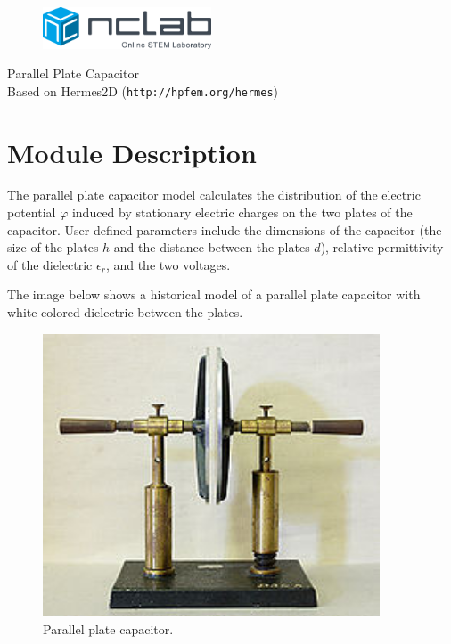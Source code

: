 \documentclass{article}
\begin{document}
\large

\vbox{}
\vspace{-2cm}
\begin{figure}[!ht]
\includegraphics[width=5cm]{img/logo.png}
\vspace{4mm}
\end{figure}
\noindent
\begin{center}
{\Huge Parallel Plate Capacitor}\\[2mm]
Based on Hermes2D ({\tt http://hpfem.org/hermes})\\[6mm]
\end{center}
\section{Module Description}

The parallel plate capacitor model calculates the distribution of the electric 
potential $\varphi$ induced by stationary electric charges on the two plates of the capacitor.
User-defined parameters include the dimensions of the capacitor (the size of the plates $h$ 
and the distance between the plates $d$), relative permittivity of the dielectric $\epsilon_r$, 
and the two voltages.

The image below shows a historical model of a parallel plate capacitor with white-colored 
dielectric between the plates.
 

\begin{figure}[!ht]
\begin{center}
\includegraphics[width=10cm]{img/capacitor.png}
\caption{Parallel plate capacitor.}
\vspace{4mm}
\end{center}
\end{figure}
\noindent
\end{document}
